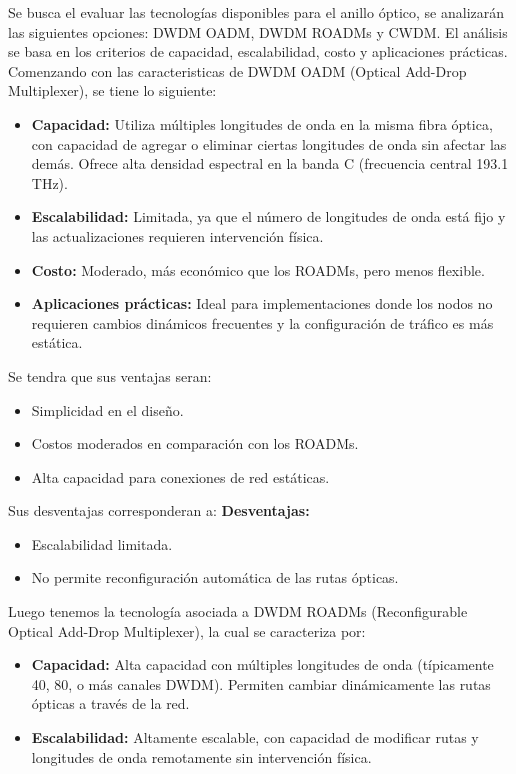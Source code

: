 \begin{itemize}
	Se busca el evaluar las tecnologías disponibles para el anillo óptico, se analizarán las siguientes opciones: DWDM OADM, DWDM ROADMs y CWDM. El análisis se basa en los criterios de capacidad, escalabilidad, costo y aplicaciones prácticas. Comenzando con las caracteristicas  de DWDM OADM (Optical Add-Drop Multiplexer), se tiene lo siguiente:
	\begin{itemize}
   	 \item \textbf{Capacidad:} Utiliza múltiples longitudes de onda en la misma fibra óptica, con capacidad de agregar o eliminar ciertas longitudes de onda sin afectar las demás. Ofrece alta densidad espectral en la banda C (frecuencia central 193.1 THz).
   	 \item \textbf{Escalabilidad:} Limitada, ya que el número de longitudes de onda está fijo y las actualizaciones requieren intervención física.
   	 \item \textbf{Costo:} Moderado, más económico que los ROADMs, pero menos flexible.
   	 \item \textbf{Aplicaciones prácticas:} Ideal para implementaciones donde los nodos no requieren cambios dinámicos frecuentes y la configuración de tráfico es más estática.
	\end{itemize}
	Se tendra que sus ventajas seran:
	\begin{itemize}
    	\item Simplicidad en el diseño.
    	\item Costos moderados en comparación con los ROADMs.
    	\item Alta capacidad para conexiones de red estáticas.
	\end{itemize}
	Sus desventajas corresponderan a:
	\textbf{Desventajas:}
	\begin{itemize}
    	\item Escalabilidad limitada.
    	\item No permite reconfiguración automática de las rutas ópticas.
	\end{itemize}
	Luego tenemos la tecnología asociada a DWDM ROADMs (Reconfigurable Optical Add-Drop Multiplexer), la cual se caracteriza por:
	\begin{itemize}
    	\item \textbf{Capacidad:} Alta capacidad con múltiples longitudes de onda (típicamente 40, 80, o más canales DWDM). Permiten cambiar dinámicamente las rutas ópticas a través de la red.
    	\item \textbf{Escalabilidad:} Altamente escalable, con capacidad de modificar rutas y longitudes de onda remotamente sin intervención física.

\end{itemize}
\end{itemize}
